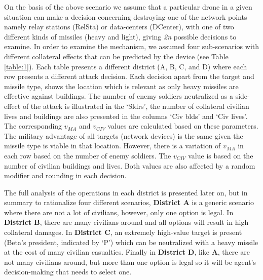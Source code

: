 On the basis of the above scenario we assume that a particular drone in a given situation can make a decision concerning destroying one of the network points namely relay stations (RelSta) or data-centers (DCenter), with one of two different kinds of missiles (heavy and light), giving \textit{2n} possible decisions to examine. In order to examine the mechanism, we assumed four sub-scenarios with different collateral effects that can be predicted by the device (see Table \ref{table:1}). Each table presents a different district (A, B, C, and D) where each row presents a different attack decision. Each decision apart from the target and missile type, shows the location which is relevant as only heavy missiles are effective against buildings. The number of enemy soldiers neutralized as a side-effect of the attack is illustrated in the `Sldrs', the number of collateral civilian lives and buildings are also presented in the columns `Civ blds' and `Civ lives'. The corresponding $v_{MA}$ and $v_{CIV}$ values are calculated based on these parameters. The military advantage of all targets (network devices) is the same given the missile type is viable in that location. However, there is a variation of $v_{MA}$ in each row based on the number of enemy soldiers. The $v_{CIV}$ value is based on the number of civilian buildings and lives. Both values are also affected by a random modifier and rounding in each decision.

The full analysis of the operations in each district is presented later on, but in summary to rationalize four different scenarios, \textbf{District A} is a generic scenario where there are not a lot of civilians, however, only one option is legal. In \textbf{District B}, there are many civilians around and all options will result in high collateral damages. In \textbf{District C}, an extremely high-value target is present (Beta's president, indicated by `P') which can be neutralized with a heavy missile at the cost of many civilian casualties. Finally in \textbf{District D}, like \textbf{A}, there are not many civilians around, but more than one option is legal so it will be agent's decision-making that needs to select one.



